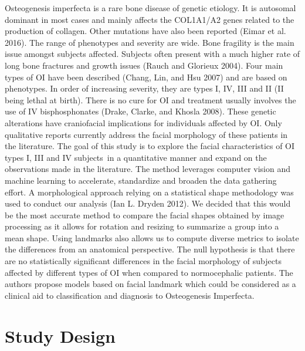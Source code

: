 \documentclass{article}
\begin{document}
\begin{multicols}{2}
Osteogenesis imperfecta is a rare bone disease of genetic etiology. It
is autosomal dominant in most cases and mainly affects the COL1A1/A2
genes related to the production of collagen. Other mutations have also
been reported (Eimar et al. 2016). The range of phenotypes and severity
are wide. Bone fragility is the main issue amongst subjects affected.
Subjects often present with a much higher rate of long bone fractures
and growth issues (Rauch and Glorieux 2004). Four main types of OI have
been described (Chang, Lin, and Hsu 2007) and are based on phenotypes.
In order of increasing severity, they are types I, IV, III and II (II
being lethal at birth). There is no cure for OI and treatment usually
involves the use of IV bisphosphonates (Drake, Clarke, and Khosla 2008).
These genetic alterations have craniofacial implications for individuals
affected by OI. Only qualitative reports currently address the facial
morphology of these patients in the literature. The goal of this study
is to explore the facial characteristics of OI types I, III and IV
subjects~in a quantitative manner and expand on the observations made in
the literature. The method leverages computer vision and machine
learning to accelerate, standardize and broaden the data gathering
effort. A morphological approach relying on a statistical shape
methodology was used to conduct our analysis (Ian L. Dryden 2012). We
decided that this would be the most accurate method to compare the
facial shapes obtained by image processing as it allows for rotation and
resizing to summarize a group into a mean shape. Using landmarks also
allows us to compute diverse metrics to isolate the differences from an
anatomical perspective. The null hypothesis is that there are no
statistically significant differences in the facial morphology of
subjects affected by different types of OI when compared to
normocephalic patients. The authors propose models based on facial
landmark which could be considered as a clinical aid to classification
and diagnosis to Osteogenesis Imperfecta.

\section{Study Design}


\end{multicols}
\end{document}
